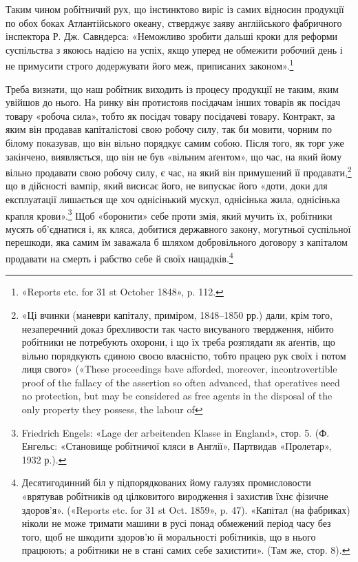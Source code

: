 Таким чином робітничий рух, що інстинктово виріс із самих
відносин продукції по обох боках Атлантійського океану, стверджує
заяву англійського фабричного інспектора Р. Дж. Савндерса:
«Неможливо зробити дальші кроки для реформи суспільства
з якоюсь надією на успіх, якщо уперед не обмежити робочий
день і не примусити строго додержувати його меж, приписаних
законом».\footnote{
«Reports etc. for 31 st October 1848», p. 112.
}

Треба визнати, що наш робітник виходить із процесу продукції
не таким, яким увійшов до нього. На ринку він протистояв
посідачам інших товарів як посідач товару «робоча сила», тобто
як посідач товару посідачеві товару. Контракт, за яким він продавав
капіталістові свою робочу силу, так би мовити, чорним по
білому показував, що він вільно порядкує самим собою. Після того,
як торг уже закінчено, виявляється, що він не був «вільним
аґентом», що час, на який йому вільно продавати свою робочу
силу, є час, на який він примушений її продавати,\footnote{
«Ці вчинки (маневри капіталу, приміром, 1848--1850 рр.) дали,
крім того, незаперечний доказ брехливости так часто висуваного твердження,
нібито робітники не потребують охорони, і що їх треба розглядати
як аґентів, що вільно порядкують єдиною своєю власністю, тобто
працею рук своїх і потом лиця свого» («These proceedings bave afforded,
moreover, incontrovertible proof of the fallacy of the assertion so often
advanced, that operatives need no protection, but may be considered as
free agents in the disposal of the only property they possess, the labour of
} що в дійсності
вампір, який висисає його, не випускає його «доти, доки для
експлуатації лишається ще хоч однісінький мускул, однісінька
жила, однісінька крапля крови».\footnote{
Friedrich Engels: «Lage der arbeitenden Klasse in England»,
стор. 5. (Ф. Енгельс: «Становище робітничої кляси в Англії», Партвидав
«Пролетар», 1932 р.).
} Щоб «боронити» себе проти
змія, який мучить їх, робітники мусять об’єднатися і, як кляса,
добитися державного закону, могутньої суспільної перешкоди,
яка самим їм заважала б шляхом добровільного договору з капіталом
продавати на смерть і рабство себе й своїх нащадків.\footnote{
Десятигодинний біл у підпорядкованих йому галузях промисловости
«врятував робітників од цілковитого виродження і захистив їхнє
фізичне здоров’я». («Reports etc. for 31 st Oct. 1859», p. 47). «Капітал
(на фабриках) ніколи не може тримати машини в русі понад обмежений
період часу без того, щоб не шкодити здоров’ю й моральності робітників,
що в нього працюють; а робітники не в стані самих себе захистити».
(Там же, стор. 8).
}
